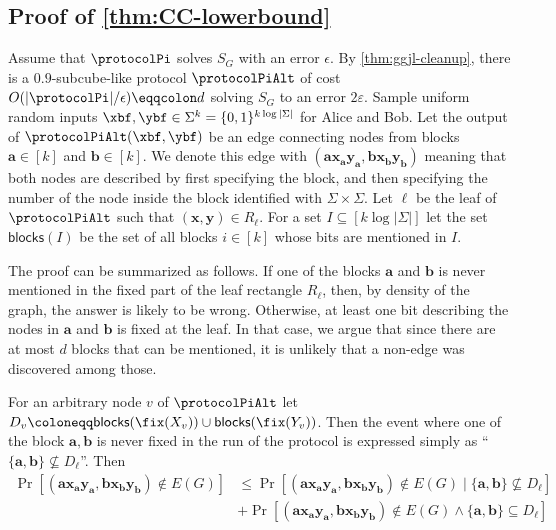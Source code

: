 \subsection{Proof of \autoref{thm:CC-lowerbound}}
\newcommand{\dng}{\textsf{blocks}}
Assume that $\protocolPi$ solves $S_{G}$ with an error $\epsilon$. By \autoref{thm:ggjl-cleanup}, there is a $0.9$-subcube-like protocol $\protocolPiAlt$ of cost $O(|\protocolPi| / \epsilon) \eqqcolon d$ solving 
$S_{G}$ to an error $2\varepsilon$. 
Sample uniform random inputs $\xbf, \ybf \in \Sigma^k = \{0,1\}^{k \log |\Sigma|}$ 
for Alice and Bob. Let the output of $\protocolPiAlt(\xbf,\ybf)$ be an edge connecting nodes from blocks $\bm a \in [k]$ and $\bm b \in [k]$. We denote this edge with $(\bm a \bm x_{\bm a} \bm y_{\bm a}, \bm b \bm x_{\bm b} \bm y_{\bm b})$ meaning that both nodes are described by first specifying the block, and then specifying the number of the node inside the block identified with $\Sigma \times \Sigma$.
Let $\bm \ell$ be the leaf of $\protocolPiAlt$ such that $(\bm x, \bm y) \in R_{\bm \ell}$.
 For a set $I \subseteq [k \log |\Sigma|]$ let the set $\dng(I)$ be the set of all blocks $i \in [k]$ whose bits are mentioned in $I$.

The proof can be summarized as follows. If one of the blocks $\bm a$ and $\bm b$ is never mentioned in the fixed part of the leaf rectangle $R_{\bm \ell}$, then, by density of the graph, the answer is likely to be wrong. Otherwise, at least one bit describing the nodes in $\bm a$ and $\bm b$ is fixed at the leaf. In that case, we argue that since there are at most $d$ blocks that can be mentioned, it is unlikely that a non-edge was discovered among those.

 For an arbitrary node $v$ of $\protocolPiAlt$ let $D_v \coloneqq \dng(\fix(X_v)) \cup \dng(\fix(Y_v))$. Then the event where one of the block $\bm a, \bm b$ is never fixed in the run of the protocol is expressed simply as ``$\{\bm a, \bm b\} \not\subseteq D_{\bm \ell}$''. Then
 \begin{align} \Pr[(\bm a \bm x_{\bm a} \bm y_{\bm a}, \bm b \bm x_{\bm b} \bm y_{\bm b}) \not\in E(G)] &\le \Pr[(\bm a \bm x_{\bm a} \bm y_{\bm a}, \bm b \bm x_{\bm b} \bm y_{\bm b}) \not\in E(G) \mid \{\bm a, \bm b\} \not\subseteq D_{\bm \ell}] \label{l:first-summand}\\
 &+ \Pr[(\bm a \bm x_{\bm a} \bm y_{\bm a}, \bm b \bm x_{\bm b} \bm y_{\bm b}) \not\in E(G) \land \{\bm a, \bm b\} \subseteq D_{\bm \ell}] \label{l:second-summand}
 \end{align}

